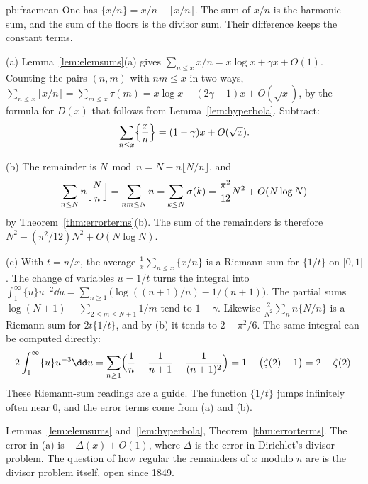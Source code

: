 \begin{solution}{pb:fracmean}
\idea One has $\{x/n\}=x/n-\lfloor x/n\rfloor$. The sum of $x/n$ is the harmonic sum, and the sum of the floors is the divisor sum. Their difference keeps the constant terms.

\writeup (a) Lemma~\ref{lem:elemsums}(a) gives $\sum_{n\le x}x/n=x\log x+\gamma x+O(1)$. Counting the pairs $(n,m)$ with $nm\le x$ in two ways, $\sum_{n\le x}\lfloor x/n\rfloor=\sum_{m\le x}\tau(m)=x\log x+(2\gamma-1)x+O(\sqrt x)$, by the formula for $D(x)$ that follows from Lemma~\ref{lem:hyperbola}. Subtract:
\[
\sum_{n\le x}\Bigl\{\frac xn\Bigr\}=(1-\gamma)x+O(\sqrt x).
\]

(b) The remainder is $N\bmod n=N-n\lfloor N/n\rfloor$, and
\[
\sum_{n\le N}n\Bigl\lfloor\frac Nn\Bigr\rfloor=\sum_{nm\le N}n=\sum_{k\le N}\sigma(k)=\frac{\pi^2}{12}N^2+O(N\log N)
\]
by Theorem~\ref{thm:errorterms}(b). The sum of the remainders is therefore $N^2-(\pi^2/12)N^2+O(N\log N)$.

(c) With $t=n/x$, the average $\frac1x\sum_{n\le x}\{x/n\}$ is a Riemann sum for $\{1/t\}$ on $]0,1]$. The change of variables $u=1/t$ turns the integral into $\int_1^\infty\{u\}u^{-2}\dd u=\sum_{n\ge1}\bigl(\log((n+1)/n)-1/(n+1)\bigr)$. The partial sums $\log(N+1)-\sum_{2\le m\le N+1}1/m$ tend to $1-\gamma$. Likewise $\frac2{N^2}\sum_n n\{N/n\}$ is a Riemann sum for $2t\{1/t\}$, and by (b) it tends to $2-\pi^2/6$. The same integral can be computed directly:
\[
2\int_1^\infty\{u\}u^{-3}\dd u=\sum_{n\ge1}\Bigl(\frac1n-\frac1{n+1}-\frac1{(n+1)^2}\Bigr)=1-\bigl(\zeta(2)-1\bigr)=2-\zeta(2).
\]
These Riemann-sum readings are a guide. The function $\{1/t\}$ jumps infinitely often near $0$, and the error terms come from (a) and (b).

\tools Lemmas~\ref{lem:elemsums} and~\ref{lem:hyperbola}, Theorem~\ref{thm:errorterms}.
\leads The error in (a) is $-\Delta(x)+O(1)$, where $\Delta$ is the error in Dirichlet's divisor problem. The question of how regular the remainders of $x$ modulo $n$ are is the divisor problem itself, open since 1849.
\end{solution}

